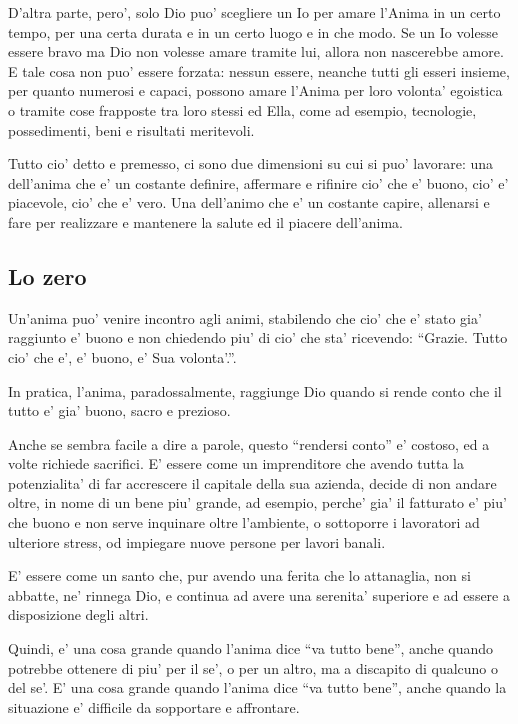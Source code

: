 D'altra parte, pero', solo Dio puo' scegliere un Io per amare l'Anima in un certo tempo, per una certa durata e in un certo luogo e in che modo. Se un Io volesse essere bravo ma Dio non volesse amare tramite lui, allora non nascerebbe amore. E tale cosa non puo' essere forzata: nessun essere, neanche tutti gli esseri insieme, per quanto numerosi e capaci, possono amare l'Anima per loro volonta' egoistica o tramite cose frapposte tra loro stessi ed Ella, come ad esempio, tecnologie, possedimenti, beni e risultati meritevoli. 

Tutto cio' detto e premesso, ci sono due dimensioni su cui si puo' lavorare: una dell'anima che e' un costante definire, affermare e rifinire cio' che e' buono, cio' e' piacevole, cio' che e' vero. Una dell'animo che e' un costante capire, allenarsi e fare per realizzare e mantenere la salute ed il piacere dell'anima.

\subsection{Lo zero}
\label{loZero}
Un'anima puo' venire incontro agli animi, stabilendo che cio' che e' stato gia' raggiunto e' buono e non chiedendo piu' di cio' che sta' ricevendo: ``Grazie. Tutto cio' che e', e' buono, e' Sua volonta'.''.

In pratica, l'anima, paradossalmente, raggiunge Dio quando si rende conto che il tutto e' gia' buono, sacro e prezioso.

Anche se sembra facile a dire a parole, questo ``rendersi conto'' e' costoso, ed a volte richiede sacrifici. E' essere come un imprenditore che avendo tutta la potenzialita' di far accrescere il capitale della sua azienda, decide di non andare oltre, in nome di un bene piu' grande, ad esempio, perche' gia' il fatturato e' piu' che buono e non serve inquinare oltre l'ambiente, o sottoporre i lavoratori ad ulteriore stress, od impiegare nuove persone per lavori banali.

E' essere come un santo che, pur avendo una ferita che lo attanaglia, non si abbatte, ne' rinnega Dio, e continua ad avere una serenita' superiore e ad essere a disposizione degli altri.

Quindi, e' una cosa grande quando l'anima dice ``va tutto bene'', anche quando potrebbe ottenere di piu' per il se', o per un altro, ma a discapito di qualcuno o del se'. E' una cosa grande quando l'anima dice ``va tutto bene'', anche quando la situazione e' difficile da sopportare e affrontare.

